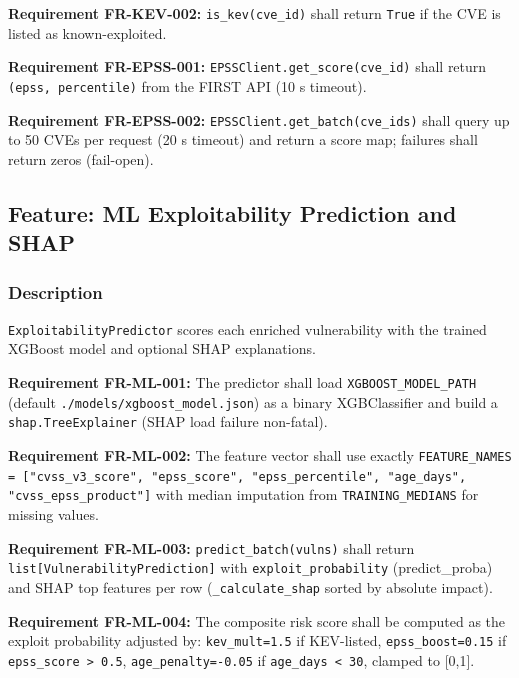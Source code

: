 \documentclass[10pt,journal,onecolumn]{IEEEtran}
\newcommand{\reqid}[1]{\textbf{#1}}
\begin{document}
\reqid{Requirement FR-KEV-002:} \texttt{is\_kev(cve\_id)} shall return \texttt{True} if the CVE is listed as known-exploited.

\reqid{Requirement FR-EPSS-001:} \texttt{EPSSClient.\allowbreak get\_\allowbreak score(cve\_\allowbreak id)} shall return \texttt{(epss, percentile)} from the FIRST API (10 s timeout).

\reqid{Requirement FR-EPSS-002:} \texttt{EPSSClient.\allowbreak get\_\allowbreak batch(cve\_\allowbreak ids)} shall query up to 50 CVEs per request (20 s timeout) and return a score map; failures shall return zeros (fail-open).

\subsection{Feature: ML Exploitability Prediction and SHAP}

\subsubsection{Description}

\texttt{ExploitabilityPredictor} scores each enriched vulnerability with the trained XGBoost model and optional SHAP explanations.

\reqid{Requirement FR-ML-001:} The predictor shall load \texttt{XGBOOST\_MODEL\_PATH} (default \texttt{.\allowbreak /\allowbreak models/\allowbreak xgboost\_\allowbreak model.\allowbreak json}) as a binary XGBClassifier and build a \texttt{shap.TreeExplainer} (SHAP load failure non-fatal).

\reqid{Requirement FR-ML-002:} The feature vector shall use exactly \texttt{FEATURE\_\allowbreak NAMES = ["cvss\_\allowbreak v3\_\allowbreak score", "epss\_\allowbreak score", "epss\_\allowbreak percentile", "age\_\allowbreak days", "cvss\_\allowbreak epss\_\allowbreak product"]} with median imputation from \texttt{TRAINING\_MEDIANS} for missing values.

\reqid{Requirement FR-ML-003:} \texttt{predict\_batch(vulns)} shall return \texttt{list[VulnerabilityPrediction]} with \texttt{exploit\_probability} (predict\_proba) and SHAP top features per row (\texttt{\_calculate\_shap} sorted by absolute impact).

\reqid{Requirement FR-ML-004:} The composite risk score shall be computed as the exploit probability adjusted by: \texttt{kev\_mult=1.5} if KEV-listed, \texttt{epss\_boost=0.15} if \texttt{epss\_score > 0.5}, \texttt{age\_penalty=-0.05} if \texttt{age\_days < 30}, clamped to [0,1].
\end{document}
